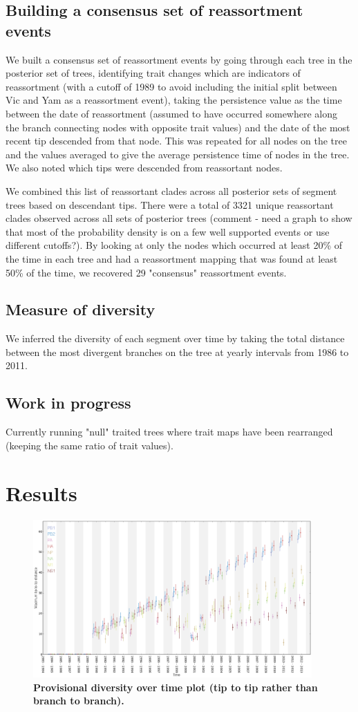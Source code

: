 \documentclass[11pt,oneside,letterpaper]{article}
\begin{document}
\subsection*{Building a consensus set of reassortment events}
We built a consensus set of reassortment events by going through each tree in the posterior set of trees, identifying trait changes which are indicators of reassortment (with a cutoff of 1989 to avoid including the initial split between Vic and Yam as a reassortment event), taking the persistence value as the time between the date of reassortment (assumed to have occurred somewhere along the branch connecting nodes with opposite trait values) and the date of the most recent tip descended from that node. This was repeated for all nodes on the tree and the values averaged to give the average persistence time of nodes in the tree. We also noted which tips were descended from reassortant nodes.

We combined this list of reassortant clades across all posterior sets of segment trees based on descendant tips. There were a total of 3321 unique reassortant clades observed across all sets of posterior trees (comment - need a graph to show that most of the probability density is on a few well supported events or use different cutoffs?). By looking at only the nodes which occurred at least 20\% of the time in each tree and had a reassortment mapping that was found at least 50\% of the time, we recovered 29 "consensus" reassortment events.

\subsection*{Measure of diversity}
We inferred the diversity of each segment over time by taking the total distance between the most divergent branches on the tree at yearly intervals from 1986 to 2011. 

\subsection*{Work in progress}
Currently running "null" traited trees where trait maps have been rearranged (keeping the same ratio of trait values).

\section*{Results}


\begin{figure}[h]
	\centering		
	\includegraphics[width=0.95\textwidth]{figures/InfB_diversityOverTime}
	\caption{\textbf{Provisional diversity over time plot (tip to tip rather than branch to branch).}}
\end{figure}




\end{document}
